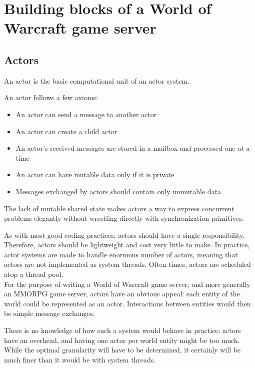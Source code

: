 \documentclass[paper=a4, fontsize=11pt]{scrartcl}
\begin{document}
\section{Building blocks of a World of Warcraft game server}

\subsection{Actors}

An actor is the basic computational unit of an actor system.

An actor follows a few axioms:
\begin{itemize}
    \item An actor can send a message to another actor
    \item An actor can create a child actor
    \item An actor's received messages are stored in a mailbox and processed one
        at a time
    \item An actor can have mutable data only if it is private
    \item Messages exchanged by actors should contain only immutable data
\end{itemize}

The lack of mutable shared state makes actors a way to express concurrent
problems elegantly without wrestling directly with synchronization primitives.

As with most good coding practices, actors should have a single responsibility.
Therefore, actors should be lightweight and cost very little to make.
In practice, actor systems are made to handle enormous number of actors, meaning
that actors are not implemented as system threads. Often times, actors are
scheduled atop a thread pool.\\

For the purpose of writing a World of Warcraft game server, and more generally
an MMORPG game server, actors have an obvious appeal: each entity of the world
could be represented as an actor.
Interactions between entities would then be simple message exchanges.

There is no knowledge of how such a system would behave in practice: actors
have an overhead, and having one actor per world entity might be too much.
While the optimal granularity will have to be determined, it certainly will be
much finer than it would be with system threads.

\end{document}
